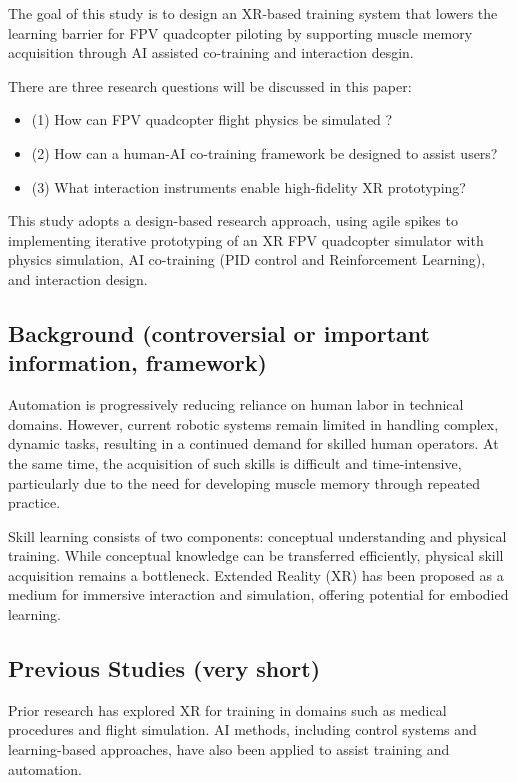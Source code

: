 The goal of this study is to design an XR-based training system that lowers the learning barrier for FPV quadcopter piloting by supporting muscle memory acquisition through AI assisted co-training and interaction desgin.

There are three research questions will be discussed in this paper:

\begin{itemize}
    \item (1) How can FPV quadcopter flight physics be simulated ?
    \item (2) How can a human-AI co-training framework be designed to assist users?
    \item (3) What interaction instruments enable high-fidelity XR prototyping?
\end{itemize}

This study adopts a design-based research approach, using agile spikes to implementing iterative prototyping of an XR FPV quadcopter simulator with physics simulation, AI co-training (PID control and Reinforcement Learning), and interaction design.

\subsection{Background (controversial or important information, framework)}
Automation is progressively reducing reliance on human labor in technical domains. However, current robotic systems remain limited in handling complex, dynamic tasks, resulting in a continued demand for skilled human operators. At the same time, the acquisition of such skills is difficult and time-intensive, particularly due to the need for developing muscle memory through repeated practice.

Skill learning consists of two components: conceptual understanding and physical training. While conceptual knowledge can be transferred efficiently, physical skill acquisition remains a bottleneck. Extended Reality (XR) has been proposed as a medium for immersive interaction and simulation, offering potential for embodied learning.

\subsection{Previous Studies (very short)}
Prior research has explored XR for training in domains such as medical procedures and flight simulation. AI methods, including control systems and learning-based approaches, have also been applied to assist training and automation.


